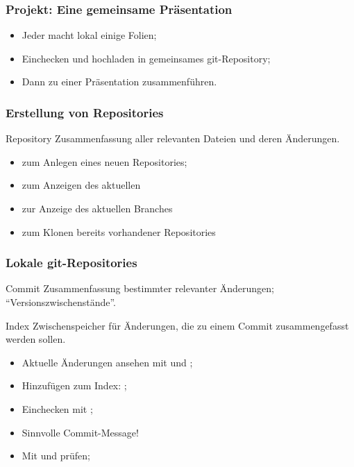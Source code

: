 \documentclass{cms-kurs}
\begin{document}
\begin{frame}
  \frametitle{Projekt: Eine gemeinsame Präsentation}

  \begin{itemize}
  \item Jeder macht lokal einige Folien;
  \item Einchecken und hochladen in gemeinsames git-Repository;
  \item Dann zu einer Präsentation zusammenführen.
  \end{itemize}

\end{frame}

\begin{frame}
  \frametitle{Erstellung von Repositories}

  \onslide<+->

  \begin{block}{Repository}
    Zusammenfassung aller relevanten Dateien und deren Änderungen.
  \end{block}

  \onslide<+->

  \begin{itemize}
  \item {} zum Anlegen eines neuen Repositories;
  \item {} zum Anzeigen des aktuellen
  \item {} zur Anzeige des aktuellen Branches
  \item {} zum Klonen bereits vorhandener Repositories
  \end{itemize}

\end{frame}

\begin{frame}
  \frametitle{Lokale git-Repositories}

  \onslide<+->

  \begin{block}{Commit}
    Zusammenfassung bestimmter relevanter Änderungen;
    \enquote{Versionszwischenstände}.
  \end{block}

  \begin{block}{Index}
    Zwischenspeicher für Änderungen, die zu einem Commit zusammengefasst werden
    sollen.
  \end{block}

  \onslide<+->

  \begin{itemize}
  \item Aktuelle Änderungen ansehen mit  und ;
  \item Hinzufügen zum Index: ;
  \item Einchecken mit ;
  \item Sinnvolle Commit-Message!
  \item Mit  und  prüfen;
  \end{itemize}

\end{frame}
\end{document}
